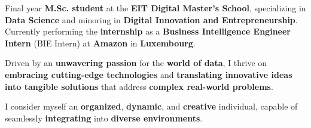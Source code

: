 

\begin{cvparagraph}

Final year \textbf{M.Sc. student} at the \textbf{EIT Digital Master’s School}, specializing in \textbf{Data Science} and minoring in \textbf{Digital Innovation and Entrepreneurship}. Currently  performing the \textbf{internship} as a \textbf{Business Intelligence Engineer Intern} (BIE Intern) at \textbf{Amazon} in \textbf{Luxembourg}.

Driven by an \textbf{unwavering passion }for the \textbf{world of data}, I thrive on \textbf{embracing cutting-edge technologies }and \textbf{translating innovative ideas into tangible solutions }that address \textbf{complex real-world problems}.

I consider myself an \textbf{organized}, \textbf{dynamic}, and \textbf{creative} individual, capable of seamlessly \textbf{integrating} into \textbf{diverse environments}.
\end{cvparagraph}
